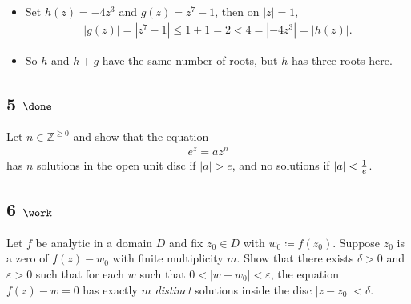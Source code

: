 \begin{solution}

\hfill

\begin{concept}

\hfill

\end{concept}

\begin{itemize}
\item
  Set \(h(z) = -4z^3\) and \(g(z) = z^7 - 1\), then on
  \({\left\lvert {z} \right\rvert} = 1\),
  \begin{align*}     {\left\lvert {g(z)} \right\rvert} = {\left\lvert {z^7 - 1} \right\rvert} \leq 1 + 1 = 2 < 4 = {\left\lvert {-4z^3} \right\rvert} = {\left\lvert {h(z)} \right\rvert}     .\end{align*}
\item
  So \(h\) and \(h+g\) have the same number of roots, but \(h\) has
  three roots here.
\end{itemize}

\end{solution}

\hypertarget{done-11}{%
\subsection{\texorpdfstring{5
\(\done\)}{5 \textbackslash done}}\label{done-11}}

Let \(n\in {\mathbb{Z}}^{\geq 0}\) and show that the equation
\begin{align*}
e^z = az^n
\end{align*}
has \(n\) solutions in the open unit disc if
\({\left\lvert {a} \right\rvert} > e\), and no solutions if
\({\left\lvert {a} \right\rvert} < {1\over e}\).

\hypertarget{work-62}{%
\subsection{\texorpdfstring{6
\(\work\)}{6 \textbackslash work}}\label{work-62}}

Let \(f\) be analytic in a domain \(D\) and fix \(z_0 \in D\) with
\(w_0 \coloneqq f(z_0)\). Suppose \(z_0\) is a zero of \(f(z) - w_0\)
with finite multiplicity \(m\). Show that there exists \(\delta >0\) and
\(\varepsilon> 0\) such that for each \(w\) such that
\(0 < {\left\lvert {w-w_0} \right\rvert} < \varepsilon\), the equation
\(f(z) - w = 0\) has exactly \(m\) \emph{distinct} solutions inside the
disc \({\left\lvert {z-z_0} \right\rvert} < \delta\).


